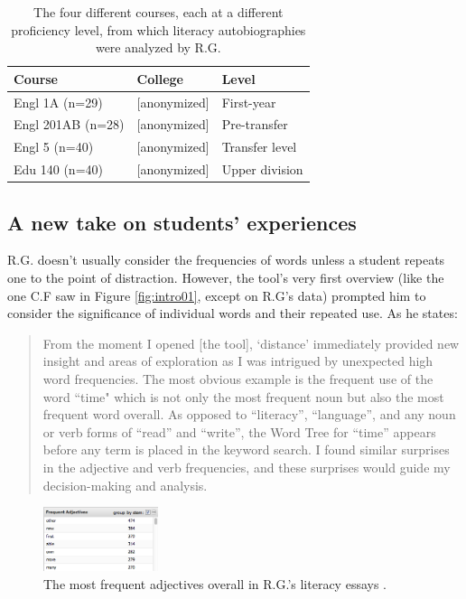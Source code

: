 \documentclass{sig-alternate}
\begin{document}
\begin{enumerate}
\begin{table}
\begin{tabular}{lll}
Course& College & Level \\
\hline
Engl 1A (n=29) & [anonymized] & First-year \\
Engl 201AB (n=28) & [anonymized] & Pre-transfer \\
Engl 5 (n=40) & [anonymized] & Transfer level \\
Edu 140 (n=40) & [anonymized] & Upper division \\
\end{tabular}
\caption{The four different courses, each at a different proficiency level, from which literacy autobiographies were analyzed by R.G. \label{table:rex-courses}}
\end{table}


 \subsection{A new take on students' experiences}

R.G. doesn't usually consider the frequencies of words unless a student repeats one to the point of distraction. However, the tool's very first overview (like the one C.F saw in Figure \ref{fig:intro01}, except on R.G's data) prompted him to consider the significance of individual words and their repeated use.  As he states:
\begin{quote}
From the moment I opened [the tool], `distance' immediately provided new insight and areas of exploration as I was intrigued by unexpected high word frequencies.  The most obvious example is the frequent use of the word ``time" which is not only the most frequent noun but also the most frequent word overall.  As opposed to ``literacy'', ``language'', and any noun or verb forms of ``read'' and ``write'', the Word Tree for ``time'' appears before any term is placed in the keyword search.   I found similar surprises in the adjective and verb frequencies, and these surprises would guide my decision-making and analysis.
\end{quote}

\begin{figure}
\begin{center}
\includegraphics[width=0.3\textwidth]{fig/rex/02.png}
\end{center}
\caption{The most frequent adjectives overall in R.G.'s literacy essays \label{fig:rex02}.}
\end{figure}


\end{enumerate}
\end{document}
